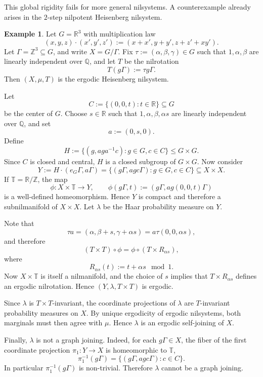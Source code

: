 \documentclass[12pt]{amsart}
\theoremstyle{plain}
\theoremstyle{definition}
\newtheorem{example}[theorem]{Example}
\newcommand\Z{\mathbb{Z}}
\newcommand\R{\mathbb{R}}
\newcommand\Q{\mathbb{Q}}
\newcommand\T{\mathbb{T}}
\begin{document}
This global rigidity fails for more general nilsystems. 
A counterexample already arises in the $2$-step nilpotent Heisenberg nilsystem. 
\begin{example}
Let $G = \R^3$ with multiplication law
\[
(x, y, z) \cdot (x', y', z') := (x + x', y + y', z + z' + x y').
\]
Let $\Gamma = \Z^3 \subseteq G$, and write $X = G/\Gamma$.  
Fix $\tau := (\alpha, \beta, \gamma) \in G$ such that $1, \alpha, \beta$ are linearly independent over $\Q$, and let $T$ be the nilrotation
\[
T(g\Gamma) := \tau g \Gamma.
\]
Then $(X, \mu, T)$ is the ergodic Heisenberg nilsystem.  

Let 
\[
C := \{(0, 0, t) : t \in \R\} \subseteq G
\]
be the center of $G$. 
Choose $s \in \R$ such that $1, \alpha, \beta, \alpha s$ are linearly independent over $\Q$, and set 
\[
a := (0, s, 0). 
\]
Define 
\[
H := \{(g, a g a^{-1} c): g \in G, c \in C\} \leq G \times G.
\]
Since $C$ is closed and central, $H$ is a closed subgroup of $G \times G$. 
Now consider 
\[
Y := H \cdot (e_G \Gamma, a \Gamma) = \{(g\Gamma, agc\Gamma) : g \in G, c \in C\} \subseteq X \times X.
\]
If $\T = \R/\Z$, the map 
\[
\phi \colon X \times \T \to Y, \qquad \phi(g\Gamma, t) := (g\Gamma, ag(0,0,t) \Gamma)
\]
is a well-defined homeomorphism.
Hence $Y$ is compact and therefore a subnilmanifold of $X \times X$.
Let $\lambda$ be the Haar probability measure on $Y$.

Note that 
\[
\tau a = (\alpha, \beta + s, \gamma + \alpha s) = a \tau (0, 0, \alpha s),
\]
and therefore
\[(T \times T) \circ \phi = \phi \circ (T \times R_{\alpha s}),\]
where 
\[
R_{\alpha s} (t) := t + \alpha s \mod 1.
\]
Now $X \times \T$ is itself a nilmanifold, and the choice of $s$ implies that $T \times R_{\alpha s}$ defines an ergodic nilrotation.
Hence $(Y, \lambda, T \times T)$ is ergodic. 

Since $\lambda$ is $T \times T$-invariant, the coordinate projections of $\lambda$ are $T$-invariant probability measures on $X$. 
By unique ergodicity of ergodic nilsystems, both marginals must then agree with $\mu$. 
Hence $\lambda$ is an ergodic self-joining of $X$.

Finally, $\lambda$ is not a graph joining. 
Indeed, for each $g\Gamma \in X$, the fiber of the first coordinate projection $\pi_1 \colon Y \to X$ is homeomorphic to $\T$,
\[
\pi_1^{-1}(g\Gamma) = \{(g\Gamma, agc\Gamma) : c \in C\}.
\]
In particular $\pi_1^{-1}(g\Gamma)$ is non-trivial.
Therefore $\lambda$ cannot be a graph joining. 
\end{example}
\end{document}
